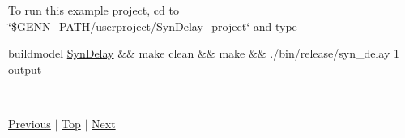 To run this example project, cd to \char`\"{}\$\+G\+E\+N\+N\+\_\+\+P\+A\+T\+H/userproject/\+Syn\+Delay\+\_\+project\char`\"{} and type 
\begin{DoxyCode}
buildmodel \hyperlink{classSynDelay}{SynDelay} && make clean && make && ./bin/release/syn\_delay 1 output
\end{DoxyCode}


~\newline
 

 \hyperlink{Quickstart_sec}{Previous} $\vert$ \hyperlink{Examples_sec}{Top} $\vert$ \hyperlink{UserManual_sec}{Next} 